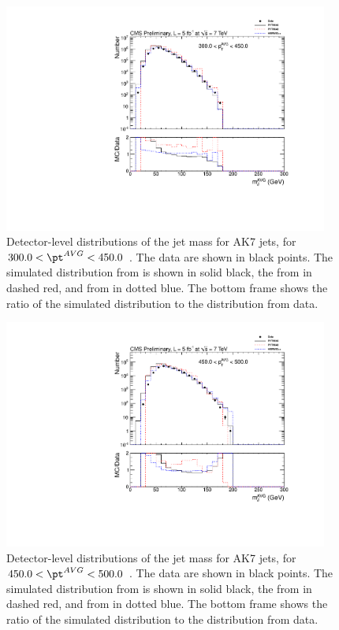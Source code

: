 \begin{figure}[htbp]
\centering
\includegraphics[width=0.95\textwidth]{figs/histAK7MjetVsPtAvg_rawDataMCComparisons_pt_5}
\caption{Detector-level distributions of the jet mass for AK7 jets,
for $300.0 < \pt^{AVG} < 450.0$ \GeVc. The data are shown in black points.
The simulated distribution from \PYTHIA is shown in solid black, 
the from \PYTHIAEIGHT in dashed red, and from \HERWIG in dotted blue. 
The bottom frame shows the ratio of the simulated distribution
to the distribution from data. 
\label{figs:histAK7MjetVsPtAvg_rawDataMCComparisons_pt_5}}
\end{figure}



\begin{figure}[htbp]
\centering
\includegraphics[width=0.95\textwidth]{figs/histAK7MjetVsPtAvg_rawDataMCComparisons_pt_6}
\caption{Detector-level distributions of the jet mass for AK7 jets,
for $450.0 < \pt^{AVG} < 500.0$ \GeVc. The data are shown in black points.
The simulated distribution from \PYTHIA is shown in solid black, 
the from \PYTHIAEIGHT in dashed red, and from \HERWIG in dotted blue. 
The bottom frame shows the ratio of the simulated distribution
to the distribution from data. 
\label{figs:histAK7MjetVsPtAvg_rawDataMCComparisons_pt_6}}
\end{figure}



